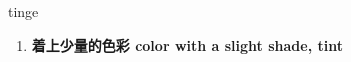 
\begin{frame}
{\huge tinge}
\begin{center}
\begin{enumerate}\Large
  \item \textbf{着上少量的色彩 color with a slight shade, tint}
\end{enumerate}
\end{center}
\end{frame}
